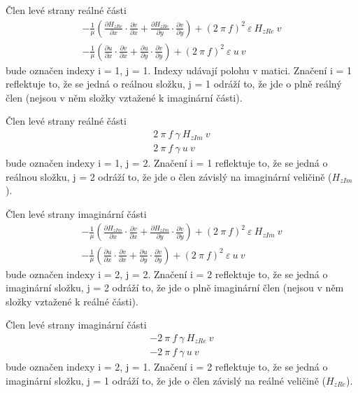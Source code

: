 \documentclass[12pt,a4paper,oneside]{article}
\numberwithin{equation}{section} %
\numberwithin{figure}{section} %
\numberwithin{table}{section} %
\begin{document}
Člen levé strany reálné části
\begin{subequations}
\begin{gather}
- \frac{1}{\mu} \left( \frac{\partial H _{zRe}}{\partial x} \cdot \frac{\partial v}{\partial x} + \frac{\partial H _{zRe}}{\partial y} \cdot \frac{\partial v}{\partial y} \right) + (2 ~ \pi ~ f) ^2 ~ \varepsilon ~ H _{zRe} ~ v
\\
- \frac{1}{\mu} \left( \frac{\partial u}{\partial x} \cdot \frac{\partial v}{\partial x} + \frac{\partial u}{\partial y} \cdot \frac{\partial v}{\partial y} \right) + (2 ~ \pi ~ f) ^2  ~ \varepsilon ~ u ~ v
\end{gather}
\end{subequations}
bude označen indexy i = 1, j = 1. Indexy udávají polohu v matici. Značení i = 1 reflektuje to, že se jedná o reálnou složku, j = 1 odráží to, že jde o plně reálný člen (nejsou v něm složky vztažené k imaginární části). 

Člen levé strany reálné části
\begin{subequations}
\begin{gather}
2 ~ \pi ~ f ~ \gamma ~ H _{zIm} ~ v
\\
2 ~ \pi ~ f ~ \gamma ~ u ~ v
\end{gather}
\end{subequations}
bude označen indexy i = 1, j = 2. Značení i = 1 reflektuje to, že se jedná o reálnou složku, j = 2 odráží to, že jde o člen závislý na imaginární veličině ($H _{zIm}$).


Člen levé strany imaginární části
\begin{subequations}
\begin{gather}
- \frac{1}{\mu} \left( \frac{\partial H _{zIm}}{\partial x} \cdot \frac{\partial v}{\partial x} + \frac{\partial H _{zIm}}{\partial y} \cdot \frac{\partial v}{\partial y} \right) + (2 ~ \pi ~ f) ^2 ~ \varepsilon ~ H _{zIm} ~ v
\\
- \frac{1}{\mu} \left( \frac{\partial u}{\partial x} \cdot \frac{\partial v}{\partial x} + \frac{\partial u}{\partial y} \cdot \frac{\partial v}{\partial y} \right) + (2 ~ \pi ~ f) ^2 ~ \varepsilon ~ u ~ v
\end{gather}
\end{subequations}
bude označen indexy i = 2, j = 2. Značení i = 2 reflektuje to, že se jedná o imaginární složku, j = 2 odráží to, že jde o plně imaginární člen (nejsou v něm složky vztažené k reálné části). 

Člen levé strany imaginární části
\begin{subequations}
\begin{gather}
- 2 ~ \pi ~ f ~ \gamma ~ H _{zRe} ~ v
\\
- 2 ~ \pi ~ f ~ \gamma ~ u ~ v
\end{gather}
\end{subequations}
bude označen indexy i = 2, j = 1. Značení i = 2 reflektuje to, že se jedná o imaginární složku, j = 1 odráží to, že jde o člen závislý na reálné veličině ($H _{zRe}$).
\end{document}

